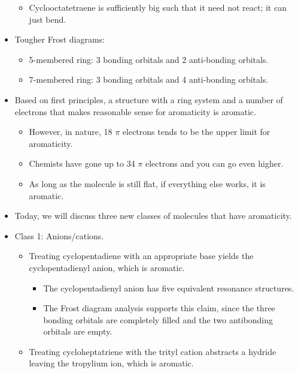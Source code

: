 \documentclass[../notes.tex]{subfiles}
\begin{document}
\begin{itemize}
\begin{itemize}
        \item Cyclooctatetraene is sufficiently big such that it need not react; it can just bend.
    \end{itemize}
    \item Tougher Frost diagrams:
    \begin{itemize}
        \item 5-membered ring: 3 bonding orbitals and 2 anti-bonding orbitals.
        \item 7-membered ring: 3 bonding orbitals and 4 anti-bonding orbitals.
    \end{itemize}
    \item Based on first principles, a structure with a ring system and a number of electrons that makes reasonable sense for aromaticity is aromatic.
    \begin{itemize}
        \item However, in nature, 18 $\pi$ electrons tends to be the upper limit for aromaticity.
        \item Chemists have gone up to 34 $\pi$ electrons and you can go even higher.
        \item As long as the molecule is still flat, if everything else works, it is aromatic.
    \end{itemize}
    \item Today, we will discuss three new classes of molecules that have aromaticity.
    \item Class 1: Anions/cations.
    \begin{itemize}
        \item Treating cyclopentadiene with an appropriate base yields the cyclopentadienyl anion, which is aromatic.
        \begin{itemize}
            \item The cyclopentadienyl anion has five equivalent resonance structures.
            \item The Frost diagram analysis supports this claim, since the three bonding orbitals are completely filled and the two antibonding orbitals are empty.
        \end{itemize}
        \item Treating cycloheptatriene with the trityl cation abstracts a hydride leaving the tropylium ion, which is aromatic.
        \begin{figure}[h!]
            \centering
            \footnotesize

\end{figure}
\end{itemize}
\end{itemize}
\end{document}
